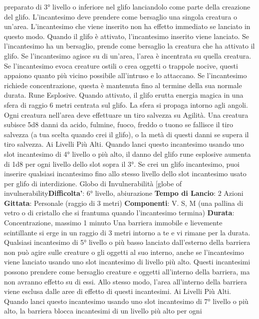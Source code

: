 \begin{multicols}{2}
preparato di 3° livello o inferiore nel glifo lanciandolo
come parte della creazione del glifo. L’incantesimo
deve prendere come bersaglio una singola creatura o
un’area. L’incantesimo che viene inserito non ha effetto
immediato se lanciato in questo modo. Quando il glifo è
attivato, l’incantesimo inserito viene lanciato. Se
l’incantesimo ha un bersaglio, prende come bersaglio la
creatura che ha attivato il glifo. Se l’incantesimo agisce
su di un’area, l’area è incentrata su quella creatura. Se
l’incantesimo evoca creature ostili o crea oggetti o
trappole nocive, questi appaiono quanto più vicino
possibile all’intruso e lo attaccano. Se l’incantesimo
richiede concentrazione, questa è mantenuta fino al
termine della sua normale durata.
Rune Esplosive. Quando attivato, il glifo erutta energia
magica in una sfera di raggio 6 metri centrata sul glifo.
La sfera si propaga intorno agli angoli. Ogni creatura
nell’area deve effettuare un tiro salvezza su Agilità.
Una creatura subisce 5d8 danni da acido, fulmine,
fuoco, freddo o tuono se fallisce il tiro salvezza (a tua
scelta quando crei il glifo), o la metà di questi danni se
supera il tiro salvezza.
Ai Livelli Più Alti. Quando lanci questo incantesimo
usando uno slot incantesimo di 4° livello o più alto, il
danno del glifo rune esplosive aumenta di 1d8 per ogni
livello dello slot sopra il 3°. Se crei un glifo incantesimo,
puoi inserire qualsiasi incantesimo fino allo stesso
livello dello slot incantesimo usato per glifo di
interdizione.
Globo di Invulnerabilità
[globe of invulnerability\textbf{Difficolta'}:
6° livello, abiurazione
\textbf{Tempo di Lancio}: 2 Azioni
\textbf{Gittata}: Personale (raggio di 3 metri)
\textbf{Componenti}: V. S, M (una pallina di vetro o di cristallo
che si frantuma quando l’incantesimo termina)
\textbf{Durata}: Concentrazione, massimo 1 minuto
Una barriera immobile e lievemente scintillante si erge
in un raggio di 3 metri intorno a te e vi rimane per la
durata.
Qualsiasi incantesimo di 5° livello o più basso lanciato
dall’esterno della barriera non può agire sulle creature o
gli oggetti al suo interno, anche se l’incantesimo viene
lanciato usando uno slot incantesimo di livello più alto.
Questi incantesimi possono prendere come bersaglio
creature e oggetti all’interno della barriera, ma non
avranno effetto su di essi. Allo stesso modo, l’area
all’interno della barriera viene esclusa dalle aree di
effetto di questi incantesimi.
Ai Livelli Più Alti. Quando lanci questo incantesimo
usando uno slot incantesimo di 7° livello o più alto, la
barriera blocca incantesimi di un livello più alto per ogni

\end{multicols}
